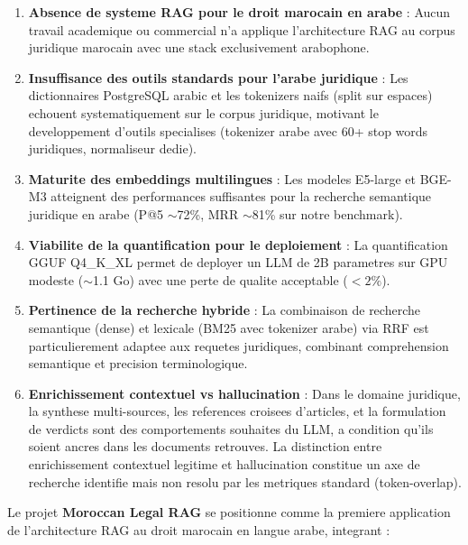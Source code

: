 \begin{enumerate}
    \item \textbf{Absence de systeme RAG pour le droit marocain en arabe} : Aucun travail academique ou commercial n'a applique l'architecture RAG au corpus juridique marocain avec une stack exclusivement arabophone.

    \item \textbf{Insuffisance des outils standards pour l'arabe juridique} : Les dictionnaires PostgreSQL arabic et les tokenizers naifs (split sur espaces) echouent systematiquement sur le corpus juridique, motivant le developpement d'outils specialises (tokenizer arabe avec 60+ stop words juridiques, normaliseur dedie).

    \item \textbf{Maturite des embeddings multilingues} : Les modeles E5-large et BGE-M3 atteignent des performances suffisantes pour la recherche semantique juridique en arabe (P@5 $\sim$72\%, MRR $\sim$81\% sur notre benchmark).

    \item \textbf{Viabilite de la quantification pour le deploiement} : La quantification GGUF Q4\_K\_XL permet de deployer un LLM de 2B parametres sur GPU modeste ($\sim$1.1 Go) avec une perte de qualite acceptable ($< 2\%$).

    \item \textbf{Pertinence de la recherche hybride} : La combinaison de recherche semantique (dense) et lexicale (BM25 avec tokenizer arabe) via RRF est particulierement adaptee aux requetes juridiques, combinant comprehension semantique et precision terminologique.

    \item \textbf{Enrichissement contextuel vs hallucination} : Dans le domaine juridique, la synthese multi-sources, les references croisees d'articles, et la formulation de verdicts sont des comportements souhaites du LLM, a condition qu'ils soient ancres dans les documents retrouves. La distinction entre enrichissement contextuel legitime et hallucination constitue un axe de recherche identifie mais non resolu par les metriques standard (token-overlap).
\end{enumerate}

Le projet \textbf{Moroccan Legal RAG} se positionne comme la premiere application de l'architecture RAG au droit marocain en langue arabe, integrant :


